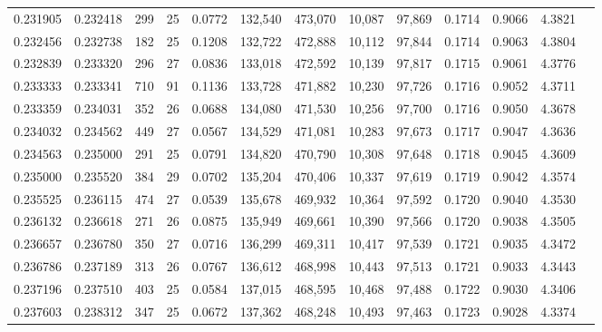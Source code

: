 \begin{tabular}{rrrrrrrrrrrrr}
0.231905 & 0.232418 &    299 &    25 &                                     0.0772 & 132,540 & 473,070 &  10,087 &  97,869 & 0.1714 & 0.9066 & 4.3821 \\
0.232456 & 0.232738 &    182 &    25 &                                     0.1208 & 132,722 & 472,888 &  10,112 &  97,844 & 0.1714 & 0.9063 & 4.3804 \\
0.232839 & 0.233320 &    296 &    27 &                                     0.0836 & 133,018 & 472,592 &  10,139 &  97,817 & 0.1715 & 0.9061 & 4.3776 \\
0.233333 & 0.233341 &    710 &    91 &                                     0.1136 & 133,728 & 471,882 &  10,230 &  97,726 & 0.1716 & 0.9052 & 4.3711 \\
0.233359 & 0.234031 &    352 &    26 &                                     0.0688 & 134,080 & 471,530 &  10,256 &  97,700 & 0.1716 & 0.9050 & 4.3678 \\
0.234032 & 0.234562 &    449 &    27 &                                     0.0567 & 134,529 & 471,081 &  10,283 &  97,673 & 0.1717 & 0.9047 & 4.3636 \\
0.234563 & 0.235000 &    291 &    25 &                                     0.0791 & 134,820 & 470,790 &  10,308 &  97,648 & 0.1718 & 0.9045 & 4.3609 \\
0.235000 & 0.235520 &    384 &    29 &                                     0.0702 & 135,204 & 470,406 &  10,337 &  97,619 & 0.1719 & 0.9042 & 4.3574 \\
0.235525 & 0.236115 &    474 &    27 &                                     0.0539 & 135,678 & 469,932 &  10,364 &  97,592 & 0.1720 & 0.9040 & 4.3530 \\
0.236132 & 0.236618 &    271 &    26 &                                     0.0875 & 135,949 & 469,661 &  10,390 &  97,566 & 0.1720 & 0.9038 & 4.3505 \\
0.236657 & 0.236780 &    350 &    27 &                                     0.0716 & 136,299 & 469,311 &  10,417 &  97,539 & 0.1721 & 0.9035 & 4.3472 \\
0.236786 & 0.237189 &    313 &    26 &                                     0.0767 & 136,612 & 468,998 &  10,443 &  97,513 & 0.1721 & 0.9033 & 4.3443 \\
0.237196 & 0.237510 &    403 &    25 &                                     0.0584 & 137,015 & 468,595 &  10,468 &  97,488 & 0.1722 & 0.9030 & 4.3406 \\
0.237603 & 0.238312 &    347 &    25 &                                     0.0672 & 137,362 & 468,248 &  10,493 &  97,463 & 0.1723 & 0.9028 & 4.3374 \\

\end{tabular}
